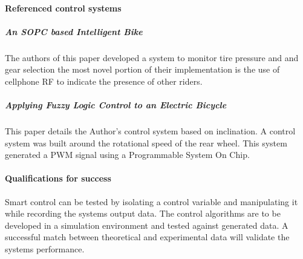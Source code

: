 \documentclass[12pt,article]{IEEEtran}
\begin{document}
        \paragraph{\bfseries Referenced control systems}
            \subparagraph{An SOPC based Intelligent Bike}   
                The authors of this paper developed a system to monitor tire pressure and and gear selection
                the most novel portion of their implementation is the use of cellphone RF to indicate the
                presence of other riders. \cite{SOPCBike}
                
            \subparagraph{Applying Fuzzy Logic Control to an Electric Bicycle}
                This paper details the Author's control system based on inclination. A control system
                was built around the rotational speed of the rear wheel. This system generated a PWM
                signal using a Programmable System On Chip.\cite{FuzzyLogicControl}
    
        \paragraph{\bfseries Qualifications for success}
            Smart control can be tested by isolating a control variable and manipulating it while recording
            the systems output data. The control algorithms are to be developed in a simulation environment and
            tested against generated data. A successful match between theoretical and experimental data will
            validate the systems performance.
                
\end{document}
